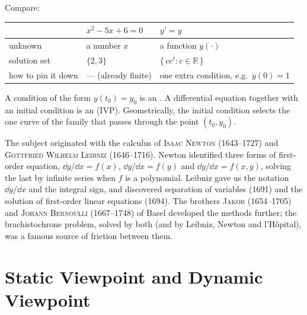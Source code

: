 \begin{eg}
	Compare:
	\begin{center}
		\begin{tabular}{@{}lll@{}}
			\toprule
			                 & \(x^2 - 5x + 6 = 0\) & \(y' = y\)                       \\
			\midrule
			unknown          & a number \(x\)       & a function \(y(\cdot)\)          \\
			solution set     & \(\{2, 3\}\)         & \(\{\,ce^{t} : c \in \mathbb{R}\,\}\) \\
			how to pin it down & --- (already finite) & one extra condition, e.g.\ \(y(0)=1\) \\
			\bottomrule
		\end{tabular}
	\end{center}
\end{eg}

\begin{definition}
	A condition of the form \(y(t_0) = y_0\) is an . A
	differential equation together with an initial condition is an  (IVP). Geometrically, the initial condition selects the one curve of the
	family that passes through the point \((t_0, y_0)\).
\end{definition}

\begin{note}
	The subject originated with the calculus of \textsc{Isaac Newton} (1643--1727) and
	\textsc{Gottfried Wilhelm Leibniz} (1646--1716). Newton identified three forms of
	first-order equation, \(\dd y/\dd x = f(x)\), \(\dd y/\dd x = f(y)\) and
	\(\dd y/\dd x = f(x,y)\), solving the last by infinite series when \(f\) is a
	polynomial. Leibniz gave us the notation \(\dd y/\dd x\) and the integral sign, and
	discovered separation of variables (1691) and the solution of first-order linear
	equations (1694). The brothers \textsc{Jakob} (1654--1705) and \textsc{Johann
		Bernoulli} (1667--1748) of Basel developed the methods further; the brachistochrone
	problem, solved by both (and by Leibniz, Newton and l'Hôpital), was a famous source of
	friction between them.
\end{note}

\section{Static Viewpoint and Dynamic Viewpoint}

